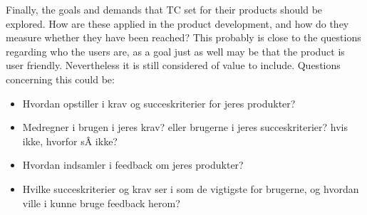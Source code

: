 %
\noindent
Finally, the goals and demands that TC set for their products should be explored. How are these applied in the product development, and how do they measure whether they have been reached? This probably is close to the questions regarding who the users are, as a goal just as well may be that the product is user friendly. Nevertheless it is still considered of value to include. Questions concerning this could be:
%
\begin{itemize}
	\item Hvordan opstiller i krav og succeskriterier for jeres produkter?
	\item Medregner i brugen i jeres krav? eller brugerne i jeres succeskriterier? hvis ikke, hvorfor sÂ ikke?
	\item Hvordan indsamler i feedback om jeres produkter?
	\item Hvilke succeskriterier og krav ser i som de vigtigste for brugerne, og hvordan ville i kunne bruge feedback herom?
\end{itemize}
%




%
%
%
%
%
%
%
%
%
%
%
%
